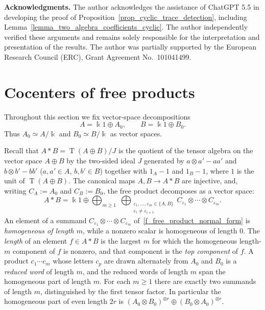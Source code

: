 \medskip

\textbf{Acknowledgments.}
The author acknowledges the assistance of ChatGPT 5.5 in developing the proof of Proposition~\ref{prop_cyclic_trace_detection}, including Lemma~\ref{lemma_two_algebra_coefficients_cyclic}.
The author independently verified these arguments and remains solely responsible for the interpretation and presentation of the results.
The author was partially supported by the European Research Council (ERC), Grant Agreement No.~101041499.

\section{Cocenters of free products}\label{sec:cocenter_free_product}

Throughout this section we fix vector-space decompositions
\begin{equation}
    A=\Bbbk 1\oplus A_0,\qquad B=\Bbbk 1\oplus B_0.
\end{equation}
Thus \(A_0\simeq A/\Bbbk\) and \(B_0\simeq B/\Bbbk \) as vector spaces.


Recall that \(A*B=\operatorname{T}(A\oplus B)/J\) is the quotient of the tensor algebra on the vector space \(A\oplus B\) by the two-sided ideal \(J\) generated by \(a\otimes a'-aa'\) and \(b\otimes b'-bb'\) (\(a,a'\in A\), \(b,b'\in B\)) together with \(1_A-1\) and \(1_B-1\), where \(1\) is the unit of \(\operatorname{T}(A\oplus B)\). The canonical maps \(A,B\to A*B\) are injective, and, writing \(C_A:=A_0\) and \(C_B:=B_0\), the free product decomposes as a vector space:
\begin{equation}\label{f_free_product_normal_form}
    A*B=\Bbbk 1\oplus
    \bigoplus_{m\geq 1}\;
    \bigoplus_{\substack{\varepsilon_1,\ldots,\varepsilon_m\in\{A,B\}\\ \varepsilon_i\neq\varepsilon_{i+1}}}
    C_{\varepsilon_1}\otimes\cdots\otimes C_{\varepsilon_m}.
\end{equation}
An element of a summand \(C_{\varepsilon_1}\otimes\cdots\otimes C_{\varepsilon_m}\) of~\eqref{f_free_product_normal_form} is \emph{homogeneous of length \(m\)}, while a nonzero scalar is homogeneous of length \(0\). The \emph{length} of an element \(f\in A*B\) is the largest \(m\) for which the homogeneous length-\(m\) component of \(f\) is nonzero, and that component is the \emph{top component} of \(f\). A product \(c_1\cdots c_m\) whose letters \(c_p\) are drawn alternately from \(A_0\) and \(B_0\) is a \emph{reduced word} of length \(m\), and the reduced words of length \(m\) span the homogeneous part of length \(m\). For each \(m\geq1\) there are exactly two summands of length \(m\), distinguished by the first tensor factor. In particular the homogeneous part of even length \(2r\) is \((A_0\otimes B_0)^{\otimes r}\oplus(B_0\otimes A_0)^{\otimes r}\).


